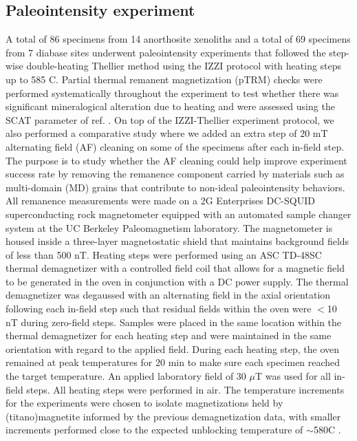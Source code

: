 \documentclass[9pt,twocolumn,twoside,lineno]{pnas-new}
\begin{document}
{\subsection*{Paleointensity experiment}
A total of 86 specimens from 14 anorthosite xenoliths and a total of 69 specimens from 7 diabase sites underwent paleointensity experiments that followed the step-wise double-heating Thellier method \cite{Thellier1959a} using the IZZI protocol \cite{Yu2004a} with heating steps up to 585 \textdegree C. Partial thermal remanent magnetization (pTRM) checks were performed systematically throughout the experiment to test whether there was significant mineralogical alteration due to heating and were assessed using the SCAT parameter of ref. \citealp{Shaar2013a}. On top of the IZZI-Thellier experiment protocol, we also performed a comparative study where we added an extra step of 20 mT alternating field (AF) cleaning on some of the specimens after each in-field step. The purpose is to study whether the AF cleaning could help improve experiment success rate by removing the remanence component carried by materials such as multi-domain (MD) grains that contribute to non-ideal paleointensity behaviors. All remanence measurements were made on a 2G Enterprises DC-SQUID superconducting rock magnetometer equipped with an automated sample changer system at the UC Berkeley Paleomagnetism laboratory. The magnetometer is housed inside a three-layer magnetostatic shield that maintains background fields of less than 500 nT. Heating steps were performed using an ASC TD-48SC thermal demagnetizer with a controlled field coil that allows for a magnetic field to be generated in the oven in conjunction with a DC power supply. The thermal demagnetizer was degaussed with an alternating field in the axial orientation following each in-field step such that residual fields within the oven were $<$10 nT during zero-field steps. Samples were placed in the same location within the thermal demagnetizer for each heating step and were maintained in the same orientation with regard to the applied field. During each heating step, the oven remained at peak temperatures for 20 min to make sure each specimen reached the target temperature. An applied laboratory field of 30 $\mu$T was used for all in-field steps. All heating steps were performed in air. The temperature increments for the experiments were chosen to isolate magnetizations held by (titano)magnetite informed by the previous demagnetization data, with smaller increments performed close to the expected unblocking temperature of $\sim$580\textdegree C \cite{Zhang2021b}. 

}
\end{document}
